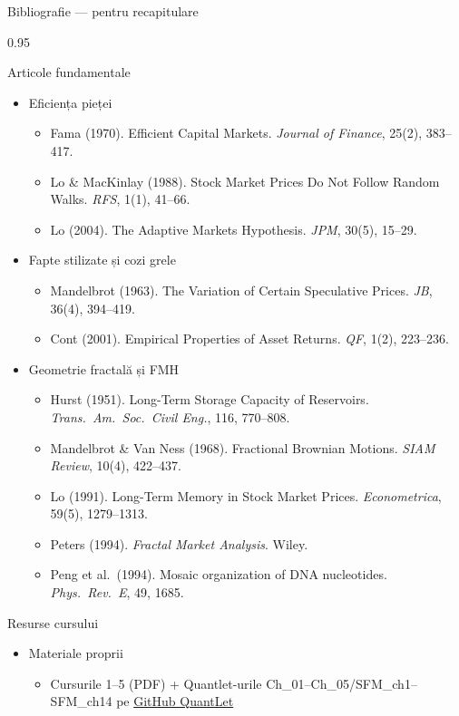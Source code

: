 \documentclass[9pt, aspectratio=169, t]{beamer}
\begin{document}
\begin{frame}[shrink=55]{Bibliografie --- pentru recapitulare}
\begin{cminipage}{0.95\textwidth}
\begin{exampleblock}{Articole fundamentale}
\begin{itemize}\setlength{\itemsep}{0pt}
    \item Eficiența pieței
    \begin{itemize}\setlength{\itemsep}{0pt}
        \item Fama (1970). Efficient Capital Markets. \textit{Journal of Finance}, 25(2), 383--417.
        \item Lo \& MacKinlay (1988). Stock Market Prices Do Not Follow Random Walks. \textit{RFS}, 1(1), 41--66.
        \item Lo (2004). The Adaptive Markets Hypothesis. \textit{JPM}, 30(5), 15--29.
    \end{itemize}
    \item Fapte stilizate și cozi grele
    \begin{itemize}\setlength{\itemsep}{0pt}
        \item Mandelbrot (1963). The Variation of Certain Speculative Prices. \textit{JB}, 36(4), 394--419.
        \item Cont (2001). Empirical Properties of Asset Returns. \textit{QF}, 1(2), 223--236.
    \end{itemize}
    \item Geometrie fractală și FMH
    \begin{itemize}\setlength{\itemsep}{0pt}
        \item Hurst (1951). Long-Term Storage Capacity of Reservoirs. \textit{Trans.\ Am.\ Soc.\ Civil Eng.}, 116, 770--808.
        \item Mandelbrot \& Van Ness (1968). Fractional Brownian Motions. \textit{SIAM Review}, 10(4), 422--437.
        \item Lo (1991). Long-Term Memory in Stock Market Prices. \textit{Econometrica}, 59(5), 1279--1313.
        \item Peters (1994). \textit{Fractal Market Analysis}. Wiley.
        \item Peng et al.\ (1994). Mosaic organization of DNA nucleotides. \textit{Phys.\ Rev.\ E}, 49, 1685.
    \end{itemize}
\end{itemize}
\end{exampleblock}

\begin{alertblock}{Resurse cursului}
\begin{itemize}\setlength{\itemsep}{0pt}
    \item Materiale proprii
    \begin{itemize}\setlength{\itemsep}{0pt}
        \item Cursurile 1--5 (PDF) + Quantlet-urile Ch\_01--Ch\_05/SFM\_ch1--SFM\_ch14 pe \href{https://github.com/QuantLet/Stat_fin_markets}{GitHub QuantLet}
    \end{itemize}
\end{itemize}
\end{alertblock}
\end{cminipage}
\end{frame}
\end{document}
